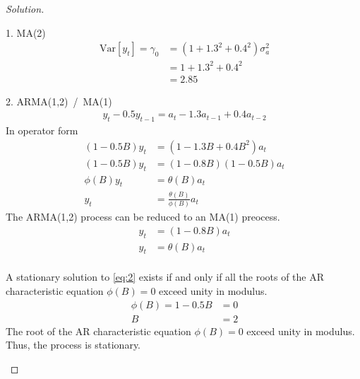 \documentclass[UTF8,a4paper,14pt]{ctexart}
\newcommand{\Var}{\mathrm{Var}}
\newenvironment{solution}
  {\renewcommand\qedsymbol{$\blacksquare$}\begin{proof}[Solution]}
  {\end{proof}}
\theoremstyle{definition}
\theoremstyle{remark}
\begin{document}
\begin{solution}
\begin{mybox}{1. MA(2)}
    \begin{equation}\
      \begin{aligned}
      \Var[y_t] =\gamma_0   
      &=(1+1.3^2+0.4^2)\sigma_a^2\\
      &=1+1.3^2+0.4^2\\
      &=2.85
      \end{aligned}
    \end{equation}
    
  \end{mybox}
  \pagebreak
  \begin{mybox}{2. ARMA(1,2) \,/\, MA(1)}
    \begin{equation}\
      \begin{aligned}\label{eq:2}
        y_t -0.5y_{t-1} = a_t-1.3a_{t-1}+0.4a_{t-2}
      \end{aligned}
    \end{equation}
    In operator form
    \begin{equation}\
      \begin{aligned}
       (1-0.5B)y_{t} &= (1-1.3B+0.4B^2)a_t\\
       (1-0.5B)y_{t} &= (1-0.8B)(1-0.5B)a_t\\
       \phi(B)y_t &= \theta(B)a_t\\
       y_t &= \frac{\theta(B)}{\phi(B)}a_t
      \end{aligned}
    \end{equation}
    \tcblower
    The ARMA(1,2) process can be reduced to an MA(1) preocess.
    \begin{equation}\
      \begin{aligned}
        y_{t} &=(1-0.8B)a_t\\
       y_t &= \theta(B)a_t\\
      \end{aligned}
    \end{equation}
    \tcbsubtitle{Stationarity}

    A stationary solution to \eqref{eq:2} exists if and only if all the roots of the AR characteristic equation \(\phi(B) = 0\) exceed unity in modulus.
    \begin{equation}\
      \begin{aligned}
        \phi(B)=1-0.5B&=0\\
        B&=2
      \end{aligned}
    \end{equation}
    The root of the AR characteristic equation \(\phi(B) = 0\) exceed unity in modulus. Thus, the process is stationary.


\end{mybox}
\end{solution}
\end{document}

